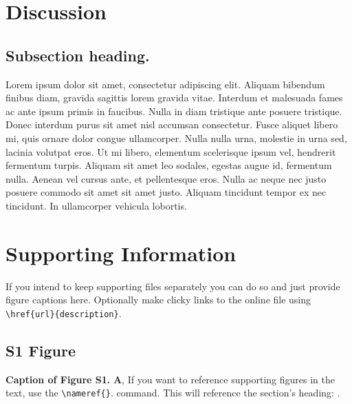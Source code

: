 \documentclass[10pt,letterpaper]{article}
\begin{document}

\section*{Discussion}
\subsection*{Subsection heading.}

Lorem ipsum dolor sit amet, consectetur adipiscing elit. Aliquam bibendum finibus diam, gravida sagittis lorem gravida vitae. Interdum et malesuada fames ac ante ipsum primis in faucibus. Nulla in diam tristique ante posuere tristique. Donec interdum purus sit amet nisl accumsan consectetur. Fusce aliquet libero mi, quis ornare dolor congue ullamcorper. Nulla nulla urna, molestie in urna sed, lacinia volutpat eros. Ut mi libero, elementum scelerisque ipsum vel, hendrerit fermentum turpis. Aliquam sit amet leo sodales, egestas augue id, fermentum nulla. Aenean vel cursus ante, et pellentesque eros. Nulla ac neque nec justo posuere commodo sit amet sit amet justo. Aliquam tincidunt tempor ex nec tincidunt. In ullamcorper vehicula lobortis. 


\section*{Supporting Information}
If you intend to keep supporting files separately you can do so and just provide figure captions here. Optionally make clicky links to the online file using \verb!\href{url}{description}!.

\setcounter{figure}{0}
\renewcommand{\thefigure}{S\arabic{figure}}

\subsection*{S1 Figure}
\label{example_label}
{\bf Caption of Figure S1.} \textbf{A}, If you want to reference supporting figures in the text, use the \verb!\nameref{}!. command. This will reference the section's heading: .
\end{document}
